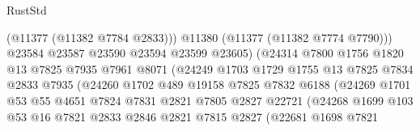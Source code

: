 \begin{lexlean}{RustStd}
\begin{coremodule}
                                      (@11377 (@11382 @7784 @2833)))
                                    @11380
                                    (@11377 (@11382 @7774 @7790)))
                                  @23584
                                  @23587
                                  @23590
                                  @23594
                                  @23599
                                  @23605)
                                (@24314
                                  @7800
                                  @1756
                                  @1820
                                  @13
                                  @7825
                                  @7935
                                  @7961
                                  @8071
                                  (@24249
                                    @1703
                                    @1729
                                    @1755
                                    @13
                                    @7825
                                    @7834
                                    @2833
                                    @7935
                                    (@24260
                                      @1702
                                      @489
                                      @19158
                                      @7825
                                      @7832
                                      @6188
                                      (@24269
                                        @1701
                                        @53
                                        @55
                                        @4651
                                        @7824
                                        @7831
                                        @2821
                                        @7805
                                        @2827
                                        @22721
                                        (@24268
                                          @1699
                                          @103
                                          @53
                                          @16
                                          @7821
                                          @2833
                                          @2846
                                          @2821
                                          @7815
                                          @2827
                                          (@22681
                                            @1698
                                            @7821

\end{coremodule}
\end{lexlean}
